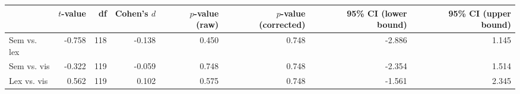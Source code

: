 \begin{tabular}{lrrrrrrr}
\toprule
{} & $t$-value &  df & Cohen's $d$ & $p$-value (raw) & $p$-value (corrected) & 95\% CI (lower bound) & 95\% CI (upper bound) \\
\midrule
Sem vs. lex &    -0.758 & 118 &      -0.138 &           0.450 &                 0.748 &                -2.886 &                 1.145 \\
Sem vs. vis &    -0.322 & 119 &      -0.059 &           0.748 &                 0.748 &                -2.354 &                 1.514 \\
Lex vs. vis &     0.562 & 119 &       0.102 &           0.575 &                 0.748 &                -1.561 &                 2.345 \\
\bottomrule
\end{tabular}
